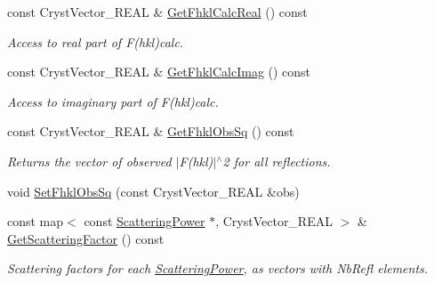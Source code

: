 \begin{DoxyCompactItemize}
const Cryst\+Vector\+\_\+\+R\+E\+AL \& \mbox{\hyperlink{class_obj_cryst_1_1_scattering_data_af95450724f3e42f50cd0fc04cb8e1d2a}{Get\+Fhkl\+Calc\+Real}} () const
\begin{DoxyCompactList}\small\item\em Access to real part of F(hkl)calc. \end{DoxyCompactList}\item 
\mbox{\label{class_obj_cryst_1_1_scattering_data_abaa9d939602278b94f19c9b592fb87c4}} 
const Cryst\+Vector\+\_\+\+R\+E\+AL \& \mbox{\hyperlink{class_obj_cryst_1_1_scattering_data_abaa9d939602278b94f19c9b592fb87c4}{Get\+Fhkl\+Calc\+Imag}} () const
\begin{DoxyCompactList}\small\item\em Access to imaginary part of F(hkl)calc. \end{DoxyCompactList}\item 
\mbox{\label{class_obj_cryst_1_1_scattering_data_a7832da89c7d39214d8a187998b512ca7}} 
const Cryst\+Vector\+\_\+\+R\+E\+AL \& \mbox{\hyperlink{class_obj_cryst_1_1_scattering_data_a7832da89c7d39214d8a187998b512ca7}{Get\+Fhkl\+Obs\+Sq}} () const
\begin{DoxyCompactList}\small\item\em Returns the vector of observed $\vert$F(hkl)$\vert$$^\wedge$2 for all reflections. \end{DoxyCompactList}\item 
void \mbox{\hyperlink{class_obj_cryst_1_1_scattering_data_acfdcb6eb721579f7cfe270d36cd7e259}{Set\+Fhkl\+Obs\+Sq}} (const Cryst\+Vector\+\_\+\+R\+E\+AL \&obs)
\item 
\mbox{\label{class_obj_cryst_1_1_scattering_data_a151fb8e51762d0b4d36f948b02351d0a}} 
const map$<$ const \mbox{\hyperlink{class_obj_cryst_1_1_scattering_power}{Scattering\+Power}} $\ast$, Cryst\+Vector\+\_\+\+R\+E\+AL $>$ \& \mbox{\hyperlink{class_obj_cryst_1_1_scattering_data_a151fb8e51762d0b4d36f948b02351d0a}{Get\+Scattering\+Factor}} () const
\begin{DoxyCompactList}\small\item\em Scattering factors for each \mbox{\hyperlink{class_obj_cryst_1_1_scattering_power}{Scattering\+Power}}, as vectors with Nb\+Refl elements. \end{DoxyCompactList}\item 

\end{DoxyCompactItemize}
